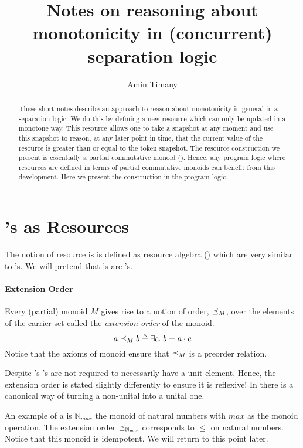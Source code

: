 \documentclass{scrartcl}
\title{Notes on reasoning about monotonicity in (concurrent) separation logic}
\author{Amin Timany}
\begin{document}
\maketitle

\begin{abstract}
  These short notes describe an approach to reason about monotonicity
  in general in a separation logic. We do this by defining a new
  resource which can only be updated in a monotone way. This resource
  allows one to take a snapshot at any moment and use this snapshot to
  reason, at any later point in time, that the current value of the
  resource is greater than or equal to the token snapshot. The
  resource construction we present is essentially a partial
  commutative monoid (\PCM{}). Hence, any program logic where resources
  are defined in terms of partial commutative monoids can benefit from
  this development. Here we present the construction in the \Iris{}
  program logic.
\end{abstract}

\section{\PCM's as Resources}
The notion of resource is \Iris{} is defined as resource algebra
(\RA{}) which are very similar to \PCM's. We will pretend that \RA{}'s
are \PCM{}'s.
\paragraph{Extension Order} Every (partial) monoid $M$ gives rise to a
notion of order, $\preceq_{M}$, over the elements of the carrier set called
the \emph{extension order} of the monoid.
\[ a \preceq_{M} b \triangleq \exists c.\; b = a \cdot c \]
%
Notice that the axioms of monoid ensure that $\preceq_{M}$ is a preorder
relation.

\begin{remark}
  Despite \PCM's{} \RA's are not required to necessarily have a unit
  element. Hence, the extension order is stated slightly differently
  to ensure it is reflexive! In \Iris{} there is a canonical way of
  turning a non-unital \RA{} into a unital one.
\end{remark}

\newcommand{\mnat}{\mathbb{N}_{\mathit{max}}}

\begin{example}
  An example of a \PCM{} is $\mnat$ the monoid of
  natural numbers with $\mathit{max}$ as the monoid operation. The
  extension order $\extle{\mnat}$ corresponds to
  $\le$ on natural numbers. Notice that this monoid is idempotent. We
  will return to this point later.
\end{example}
\end{document}
